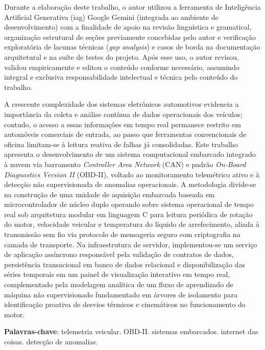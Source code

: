 \documentclass[
	12pt,				%
	openright,			%
	twoside,			%
	a4paper,			%
	english,			%
	brazil				%
	]{abntex2}
\begin{document}
\frenchspacing

\imprimircapa

\imprimirfolhaderosto*


Durante a elaboração deste trabalho, o autor utilizou a ferramenta de Inteligência
Artificial Generativa (\acrshort{iag}) Google Gemini (integrada ao ambiente de
desenvolvimento) com a finalidade de apoio na revisão linguística e gramatical,
organização estrutural de seções previamente concebidas pelo autor e verificação
exploratória de lacunas técnicas (\textit{gap analysis}) e casos de borda na
documentação arquitetural e na suíte de testes do projeto. Após esse uso, o autor
revisou, validou empiricamente e editou o conteúdo conforme necessário, assumindo
integral e exclusiva responsabilidade intelectual e técnica pelo conteúdo do trabalho.
\cleardoublepage

\setlength{\absparsep}{18pt}
\begin{resumo}
A crescente complexidade dos sistemas eletrônicos automotivos evidencia a importância da
coleta e análise contínua de dados operacionais dos veículos; contudo, o acesso a essas
informações em tempo real permanece restrito em automóveis comerciais de entrada, ao
passo que ferramentas convencionais de oficina limitam-se à leitura reativa de falhas já
consolidadas. Este trabalho apresenta o desenvolvimento de um sistema computacional
embarcado integrado à nuvem via barramento \textit{Controller Area Network} (CAN) e
padrão \textit{On-Board Diagnostics Version II} (OBD-II), voltado ao monitoramento
telemétrico ativo e à detecção não supervisionada de anomalias operacionais. A
metodologia divide-se na construção de uma unidade de aquisição embarcada baseada em
microcontrolador de núcleo duplo operando sobre sistema operacional de tempo real sob
arquitetura modular em linguagem C para leitura periódica de rotação do motor,
velocidade veicular e temperatura do líquido de arrefecimento, aliada à transmissão sem
fio via protocolo de mensageria seguro com criptografia na camada de transporte. Na
infraestrutura de servidor, implementou-se um serviço de aplicação assíncrono
responsável pela validação de contratos de dados, persistência transacional em banco de
dados relacional e disponibilização das séries temporais em um painel de visualização
interativo em tempo real, complementado pela modelagem analítica de um fluxo de
aprendizado de máquina não supervisionado fundamentado em árvores de isolamento para
identificação proativa de desvios térmicos e cinemáticos no funcionamento do motor.

\textbf{Palavras-chave}: telemetria veicular. OBD-II. sistemas embarcados. internet das
coisas. detecção de anomalias.
\end{resumo}
\end{document}
